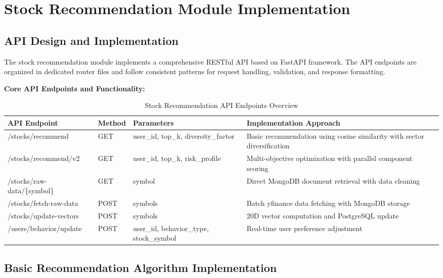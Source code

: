 \section{Stock Recommendation Module Implementation}

\subsection{API Design and Implementation}

The stock recommendation module implements a comprehensive RESTful API based on FastAPI framework. The API endpoints are organized in dedicated router files and follow consistent patterns for request handling, validation, and response formatting.

\textbf{Core API Endpoints and Functionality:}

\begin{table}[h]
\centering
\caption{Stock Recommendation API Endpoints Overview}
\begin{tabular}{|p{3.5cm}|p{2.5cm}|p{3cm}|p{4cm}|}
\hline
\textbf{API Endpoint} & \textbf{Method} & \textbf{Parameters} & \textbf{Implementation Approach} \\
\hline
/stocks/recommend & GET & user\_id, top\_k, diversity\_factor & Basic recommendation using cosine similarity with sector diversification \\
\hline
/stocks/recommend/v2 & GET & user\_id, top\_k, risk\_profile & Multi-objective optimization with parallel component scoring \\
\hline
/stocks/raw-data/\{symbol\} & GET & symbol & Direct MongoDB document retrieval with data cleaning \\
\hline
/stocks/fetch-raw-data & POST & symbols & Batch yfinance data fetching with MongoDB storage \\
\hline
/stocks/update-vectors & POST & symbols & 20D vector computation and PostgreSQL update \\
\hline
/users/behavior/update & POST & user\_id, behavior\_type, stock\_symbol & Real-time user preference adjustment \\
\hline
\end{tabular}
\end{table}



\subsection{Basic Recommendation Algorithm Implementation}

